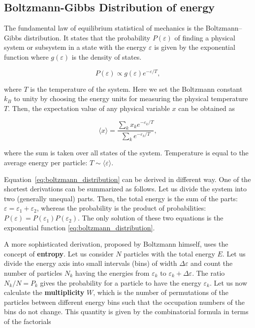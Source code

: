 \subsection{Boltzmann-Gibbs Distribution of energy}

The fundamental law of equilibrium statistical of mechanics is the
Boltzmann--Gibbs distribution. It states that the probability
$P(\varepsilon)$ of finding a physical system or subsystem in a state
with the energy $\varepsilon$ is given by the exponential function
where $g(\varepsilon)$ is the density of states.

\begin{equation}
    P(\varepsilon) \propto g(\varepsilon) e^{-\varepsilon/T},
    \label{eq:boltzmann_distribution}
\end{equation}

where $T$ is the temperature of the system.
Here we set the Boltzmann constant $k_B$ to unity
by choosing the energy units for measuring the physical temperature
$T$. Then, the expectation value of any physical variable $x$ can be
obtained as

\begin{equation}
    \langle x \rangle =
    \frac{\sum_k x_k e^{-\varepsilon_k/T}}
    {\sum_k e^{-\varepsilon_k/T}},
    \label{eq:expectation_value}
\end{equation}

where the sum is taken over all states of the system. 
Temperature is equal to the average energy per particle:
$T \sim \langle \varepsilon \rangle$.

Equation~\eqref{eq:boltzmann_distribution} can be derived in different
way. One of the shortest derivations can be summarized as
follows. Let us divide the system into two (generally unequal) parts.
Then, the total energy is the sum of the parts:
$\varepsilon = \varepsilon_1 + \varepsilon_2$, whereas the probability
is the product of probabilities:
$P(\varepsilon) = P(\varepsilon_1)P(\varepsilon_2)$. The only solution
of these two equations is the exponential function
\eqref{eq:boltzmann_distribution}.

A more sophisticated derivation, proposed by Boltzmann himself, uses
the concept of \textbf{entropy}. Let us consider $N$ particles with the total
energy $E$. Let us divide the energy axis into small intervals (bins)
of width $\Delta\varepsilon$ and count the number of particles $N_k$
having the energies from $\varepsilon_k$ to $\varepsilon_k +
\Delta\varepsilon$. The ratio $N_k/N = P_k$ gives the probability for
a particle to have the energy $\varepsilon_k$. Let us now calculate the
\textbf{multiplicity} $W$, which is the number of permutations of the particles
between different energy bins such that the occupation numbers of the
bins do not change. This quantity is given by the combinatorial formula
in terms of the factorials

